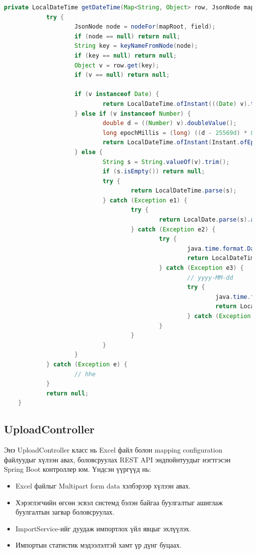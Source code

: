 \begin{lstlisting}[language=Java, caption=Огнооны хувиргалт, frame=single]
	private LocalDateTime getDateTime(Map<String, Object> row, JsonNode mapRoot, String field) {
			try {
					JsonNode node = nodeFor(mapRoot, field);
					if (node == null) return null;
					String key = keyNameFromNode(node);
					if (key == null) return null;
					Object v = row.get(key);
					if (v == null) return null;

					if (v instanceof Date) {
							return LocalDateTime.ofInstant(((Date) v).toInstant(), ZoneId.systemDefault());
					} else if (v instanceof Number) {
							double d = ((Number) v).doubleValue();
							long epochMillis = (long) ((d - 25569d) * 86400d * 1000d); // excel serial -> epoch
							return LocalDateTime.ofInstant(Instant.ofEpochMilli(epochMillis), ZoneId.systemDefault());
					} else {
							String s = String.valueOf(v).trim();
							if (s.isEmpty()) return null;
							try {
									return LocalDateTime.parse(s);
							} catch (Exception e1) {
									try {
											return LocalDate.parse(s).atStartOfDay();
									} catch (Exception e2) {
											try {
													java.time.format.DateTimeFormatter fmt = java.time.format.DateTimeFormatter.ofPattern("yyyy-MM-dd HH:mm:ss");
													return LocalDateTime.parse(s, fmt);
											} catch (Exception e3) {
													// yyyy-MM-dd
													try {
															java.time.format.DateTimeFormatter f2 = java.time.format.DateTimeFormatter.ofPattern("yyyy-MM-dd");
															return LocalDate.parse(s, f2).atStartOfDay();
													} catch (Exception ignore) { }
											}
									}
							}
					}
			} catch (Exception e) {
					// hhe
			}
			return null;
	}
\end{lstlisting}


\subsection{UploadController}

Энэ UploadController класс нь Excel файл болон mapping configuration файлуудыг хүлээн авах, боловсруулах REST API эндпойнтуудыг нэгтгэсэн Spring Boot контроллер юм. Үндсэн үүргүүд нь:
\begin{itemize}
	\item Excel файлыг Multipart form data хэлбэрээр хүлээн авах.
	\item Хэрэглэгчийн өгсөн эсвэл системд бэлэн байгаа буулгалтыг ашиглаж буулгалтын загвар боловсруулах.
	\item ImportService-ийг дуудаж импортлох үйл явцыг эхлүүлэх.
	\item Импортын статистик мэдээлэлтэй хамт үр дүнг буцаах.
\end{itemize}

